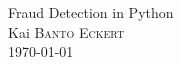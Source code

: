 \begin{titlepage}
\center
\vspace*{\fill}
{{\Huge Fraud Detection in Python}}\\[0.5cm]

{Kai {\scshape Banto Eckert}}\\[0.5cm]

{\today}
\vspace*{\fill}
\end{titlepage}